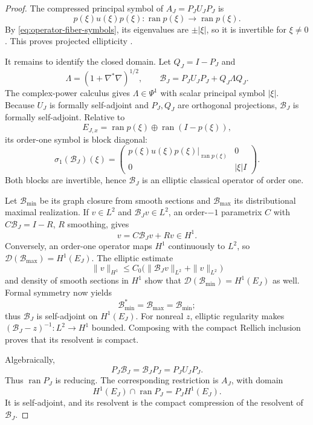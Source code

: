 \documentclass[11pt]{article}
\theoremstyle{definition}
\begin{document}
\begin{proof}
The compressed principal symbol of $A_J=P_JU_JP_J$ is
\[
 p(\xi)u(\xi)p(\xi):
 \operatorname{ran}p(\xi)\longrightarrow\operatorname{ran}p(\xi).
\]
By \eqref{eq:operator-fiber-symbols}, its eigenvalues are
$\pm|\xi|$, so it is invertible for $\xi\neq0$.  This proves projected
ellipticity \cite{SavinSternin1999,Seiler2012}.

It remains to identify the closed domain.  Let $Q_J=I-P_J$ and
\[
 \Lambda=(1+\nabla^*\nabla)^{1/2},\qquad
 \mathcal B_J=P_JU_JP_J+Q_J\Lambda Q_J.
\]
The complex-power calculus gives $\Lambda\in\Psi^1$ with scalar principal
symbol $|\xi|$.  Because $U_J$ is formally self-adjoint and $P_J,Q_J$ are
orthogonal projections, $\mathcal B_J$ is formally self-adjoint.  Relative
to
\[
 E_{J,x}=\operatorname{ran}p(\xi)\oplus
 \operatorname{ran}(I-p(\xi)),
\]
its order-one symbol is block diagonal:
\[
 \sigma_1(\mathcal B_J)(\xi)=
 \begin{pmatrix}
 p(\xi)u(\xi)p(\xi)|_{\operatorname{ran}p(\xi)}&0\\
 0&|\xi|I
 \end{pmatrix}.
\]
Both blocks are invertible, hence $\mathcal B_J$ is an elliptic classical
operator of order one.

Let $\mathcal B_{\min}$ be its graph closure from smooth sections and
$\mathcal B_{\max}$ its distributional maximal realization.  If
$v\in L^2$ and $\mathcal B_Jv\in L^2$, an order-$-1$ parametrix $C$ with
$C\mathcal B_J=I-R$, $R$ smoothing, gives
\[
 v=C\mathcal B_Jv+Rv\in H^1.
\]
Conversely, an order-one operator maps $H^1$ continuously to $L^2$, so
$\mathcal D(\mathcal B_{\max})=H^1(E_J)$.  The elliptic estimate
\[
 \|v\|_{H^1}\leq C_0
 \bigl(\|\mathcal B_Jv\|_{L^2}+\|v\|_{L^2}\bigr)
\]
and density of smooth sections in $H^1$ show that
$\mathcal D(\mathcal B_{\min})=H^1(E_J)$ as well.  Formal symmetry now yields
\[
 \mathcal B_{\min}^*=\mathcal B_{\max}=\mathcal B_{\min};
\]
thus $\mathcal B_J$ is self-adjoint on $H^1(E_J)$.  For nonreal $z$,
elliptic regularity makes $(\mathcal B_J-z)^{-1}:L^2\to H^1$ bounded.
Composing with the compact Rellich inclusion proves that its resolvent is
compact.

Algebraically,
\[
 P_J\mathcal B_J=\mathcal B_JP_J=P_JU_JP_J.
\]
Thus $\operatorname{ran}P_J$ is reducing.  The corresponding restriction is
$A_J$, with domain
\[
 H^1(E_J)\cap\operatorname{ran}P_J=P_JH^1(E_J).
\]
It is self-adjoint, and its resolvent is the compact compression of the
resolvent of $\mathcal B_J$.


\end{proof}
\end{document}
